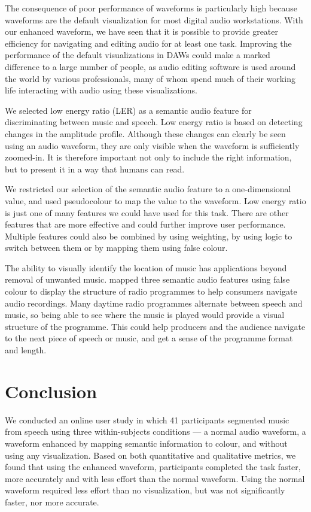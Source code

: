 The consequence of poor performance of waveforms is particularly high because waveforms are the default visualization
for most digital audio workstations. With our enhanced waveform, we have seen that it is possible to provide greater
efficiency for navigating and editing audio for at least one task.  Improving the performance of the default
visualizations in DAWs could make a marked difference to a large number of people, as audio editing software is
used around the world by various professionals, many of whom spend much of their working life interacting with audio
using these visualizations.

We selected low energy ratio (LER) as a semantic audio feature for discriminating between music and speech.  Low energy ratio
is based on detecting changes in the amplitude profile.  Although these changes can clearly be seen using an audio
waveform, they are only visible when the waveform is sufficiently zoomed-in.  It is therefore important not only to 
include the right information, but to present it in a way that humans can read.

We restricted our selection of the semantic audio feature to a one-dimensional value, and used pseudocolour to map the
value to the waveform.  Low energy ratio is just one of many features we could have used for this task.  There are
other features that are more effective and could further improve user performance. Multiple features could
also be combined by using weighting, by using logic to switch between them or by mapping them using false colour.

The ability to visually identify the location of music has applications beyond removal of unwanted music.
\citet{Mason2007} mapped three semantic audio features using false colour to display the structure of radio programmes
to help consumers navigate audio recordings.  Many daytime radio programmes alternate between speech and music, so
being able to see where the music is played would provide a visual structure of the programme. This could help
producers and the audience navigate to the next piece of speech or music, and get a sense of the programme format and
length.

\section{Conclusion}\label{sec:vis-conclusions}

We conducted an online user study in which 41 participants segmented music from speech using three within-subjects
conditions --- a normal audio waveform, a waveform enhanced by mapping semantic information to colour, and without using
any visualization.  Based on both quantitative and qualitative metrics, we found that using the enhanced waveform,
participants completed the task faster, more accurately and with less effort than the normal waveform. Using the normal
waveform required less effort than no visualization, but was not significantly faster, nor more accurate.

